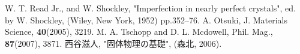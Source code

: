 \documentclass[a4j,twocolumn]{jsarticle}
\begin{document}
\vspace{0.5\baselineskip}

{\small\setlength\baselineskip{10pt}	%
\begin{thebibliography}{9}
W. T. Read Jr., and W. Shockley, "Imperfection in nearly perfect crystals", ed. by W. Shockley, (Wiley, New York, 1952) pp.352--76.
 A. Otsuki, J. Materials Science, {\bf 40}(2005), 3219.
 M. A. Tschopp and D. L. Mcdowell, Phil. Mag., {\bf 87}(2007), 3871.
 西谷滋人, "固体物理の基礎", (森北, 2006).
\end{thebibliography}
}
\end{document}
